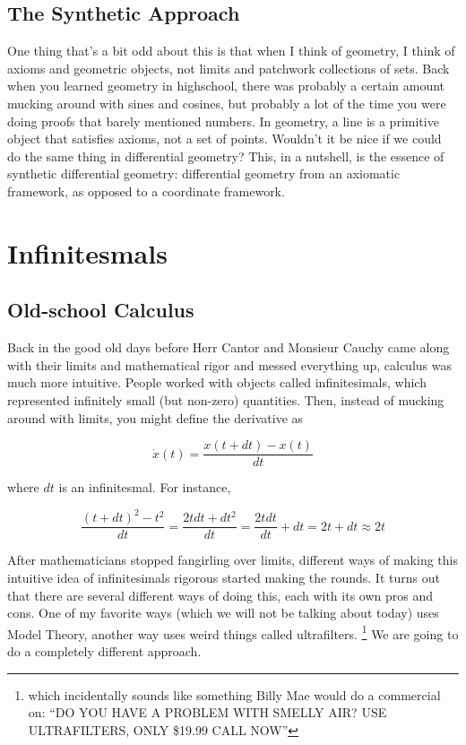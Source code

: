 \documentclass[]{book}
\begin{document}
\hypertarget{the-synthetic-approach}{%
\subsection{The Synthetic Approach}\label{the-synthetic-approach}}

One thing that's a bit odd about this is that when I think of geometry, I think of axioms and geometric objects, not limits and patchwork collections of sets. Back when you learned geometry in highschool, there was probably a certain amount mucking around with sines and cosines, but probably a lot of the time you were doing proofs that barely mentioned numbers. In geometry, a line is a primitive object that satisfies axioms, not a set of points. Wouldn't it be nice if we could do the same thing in differential geometry? This, in a nutshell, is the essence of synthetic differential geometry: differential geometry from an axiomatic framework, as opposed to a coordinate framework.  

\hypertarget{infinitesmals}{%
\section{Infinitesmals}\label{infinitesmals}}

\hypertarget{old-school-calculus}{%
\subsection{Old-school Calculus}\label{old-school-calculus}}

Back in the good old days before Herr Cantor and Monsieur Cauchy came along with their limits and mathematical rigor and messed everything up, calculus was much more intuitive. People worked with objects called infinitesimals, which represented infinitely small (but non-zero) quantities. Then, instead of mucking around with limits, you might
define the derivative as

\[ \dot{x}(t) = \frac{x(t + dt) - x(t)}{dt} \]

where $dt$ is an infinitesmal. For instance,

\[ \frac{(t + dt)^2 - t^2}{dt} = \frac{2tdt+dt^2}{dt} = \frac{2tdt}{dt} + dt = 2t + dt \approx 2t \]

After mathematicians stopped fangirling over limits, different ways of making this intuitive idea of infinitesimals rigorous started making the rounds. It turns out that there are several different ways of doing this, each with its own pros and cons. One of my favorite ways (which we will not be talking about today) uses Model Theory, another way uses weird things called ultrafilters. \footnote{which incidentally sounds like something Billy Mae would do a commercial on: ``DO YOU HAVE A PROBLEM WITH SMELLY AIR? USE ULTRAFILTERS, ONLY \$19.99 CALL NOW''} We are going to do a completely different approach.
\end{document}
